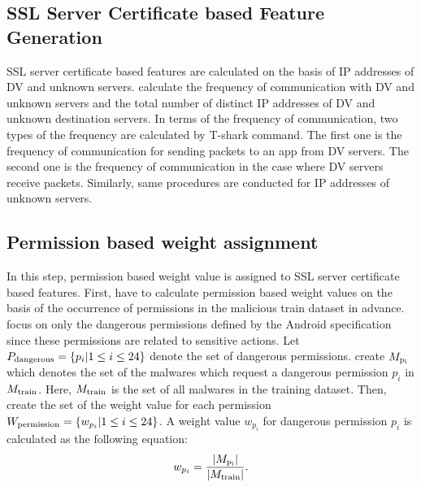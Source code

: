 \subsection{SSL Server Certificate based Feature Generation}
SSL server certificate based features are calculated on the basis of IP addresses of DV and unknown servers.
\We calculate the frequency of communication with DV and unknown servers and the total number of distinct IP addresses of DV and unknown destination servers.
In terms of the frequency of communication, two types of the frequency are calculated by T-shark command.
The first one is the frequency of communication for sending packets to an app from DV servers.
The second one is the frequency of communication in the case where DV servers receive packets.
Similarly, same procedures are conducted for IP addresses of unknown servers.

\subsection{Permission based weight assignment}
In this step, permission based weight value is assigned to SSL server certificate based features.
First, \we have to calculate permission based weight values on the basis of the occurrence of permissions in the malicious train dataset in advance.
\We focus on only the dangerous permissions defined by the Android specification since these permissions are related to sensitive actions.
Let $P_{\mathrm{dangerous}} = \{p_i|1\leq i \leq 24\}$ denote the set of dangerous permissions. 
\We create $M_{\mathrm{p_i}}$ which denotes the set of the malwares which request a dangerous permission $p_i$ in $M_{\mathrm{train}}$.
Here, $M_{\mathrm{train}}$ is the set of all malwares in the training dataset.
Then, \we create the set of the weight value for each permission $W_{\mathrm{permission}} = \{w_{p_i}|1\leq i \leq 24\}$.
A weight value $w_{p_i}$ for dangerous permission $p_i$ is calculated as the following equation:
\begin{equation}
  w_{p_i} = \frac{|M_{\mathrm{p_i}}|}{|M_{\mathrm{train}}|}.  
\end{equation}

